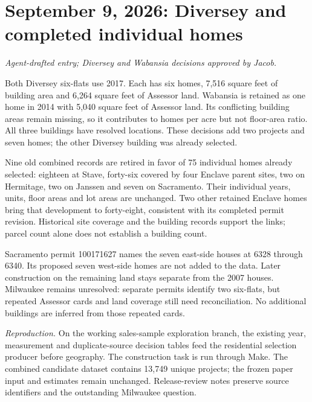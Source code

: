 \clearpage
\section*{September 9, 2026: Diversey and completed individual homes}
\textit{Agent-drafted entry; Diversey and Wabansia decisions approved by Jacob.}

Both Diversey six-flats use 2017. Each has six homes, 7,516 square feet of building area and 6,264 square feet of Assessor land. Wabansia is retained as one home in 2014 with 5,040 square feet of Assessor land. Its conflicting building areas remain missing, so it contributes to homes per acre but not floor-area ratio. All three buildings have resolved locations. These decisions add two projects and seven homes; the other Diversey building was already selected.

Nine old combined records are retired in favor of 75 individual homes already selected: eighteen at Stave, forty-six covered by four Enclave parent sites, two on Hermitage, two on Janssen and seven on Sacramento. Their individual years, units, floor areas and lot areas are unchanged. Two other retained Enclave homes bring that development to forty-eight, consistent with its completed permit revision. Historical site coverage and the building records support the links; parcel count alone does not establish a building count.

Sacramento permit 100171627 names the seven east-side houses at 6328 through 6340. Its proposed seven west-side homes are not added to the data. Later construction on the remaining land stays separate from the 2007 houses. Milwaukee remains unresolved: separate permits identify two six-flats, but repeated Assessor cards and land coverage still need reconciliation. No additional buildings are inferred from those repeated cards.

\medskip
\noindent\textit{Reproduction.} On the working sales-sample exploration branch, the existing year, measurement and duplicate-source decision tables feed the residential selection producer before geography. The construction task is run through Make. The combined candidate dataset contains 13,749 unique projects; the frozen paper input and estimates remain unchanged. Release-review notes preserve source identifiers and the outstanding Milwaukee question.

